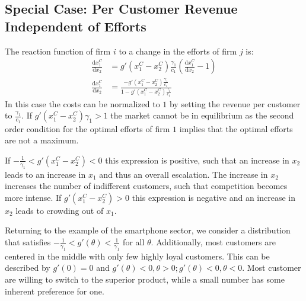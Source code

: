 \documentclass[a4paper, 11pt]{article}
\renewcommand{\d}{\text{d}}
\begin{document}
\subsection{Special Case: Per Customer Revenue Independent of Efforts}

The reaction function of firm $i$ to a change in the efforts of firm $j$ is:
\begin{align}
\frac{\d x_1^C}{\d x_2} &= g'(x_1^C-x_2^C)\frac{\gamma_1}{c_1}\left(\frac{\d x_1^C}{\d x_2}-1\right)\\
\frac{\d x_1^C}{\d x_2} &= \frac{-g'(x_1^C-x_2^C)\frac{\gamma_1}{c_1}}{1-g'(x_1^C-x_2^C)\frac{\gamma_1}{c_1}}
\end{align}
In this case the costs can be normalized to $1$ by setting the revenue per customer to $\frac{\gamma_1}{c_1}$. If $g'(x_1^C-x_2^C)\gamma_1 > 1$ the market cannot be in equilibrium as the second order condition for the optimal efforts of firm $1$  implies that the optimal efforts are not a maximum.

If $-\frac{1}{\gamma_1}<g'(x_1^C-x_2^C)<0$ this expression is positive, such that an increase in $x_2$ leads to an increase in $x_1$ and thus an overall escalation. The increase in $x_2$ increases the number of indifferent customers, such that competition becomes more intense. If $g'(x_1^C-x_2^C)>0$ this expression is negative and an increase in $x_2$ leads to crowding out of $x_1$. 

Returning to the example of the smartphone sector, we consider a distribution that satisfies $-\frac{1}{\gamma_1}<g'(\theta)<\frac{1}{\gamma_1}$ for all $\theta$. Additionally, most customers are centered in the middle with only few highly loyal customers. This can be described by $g'(0)=0$ and $g'(\theta)<0, \theta>0; g'(\theta)<0, \theta<0$. Most customer are willing to switch to the superior product, while a small number has some inherent preference for one.
\end{document}

